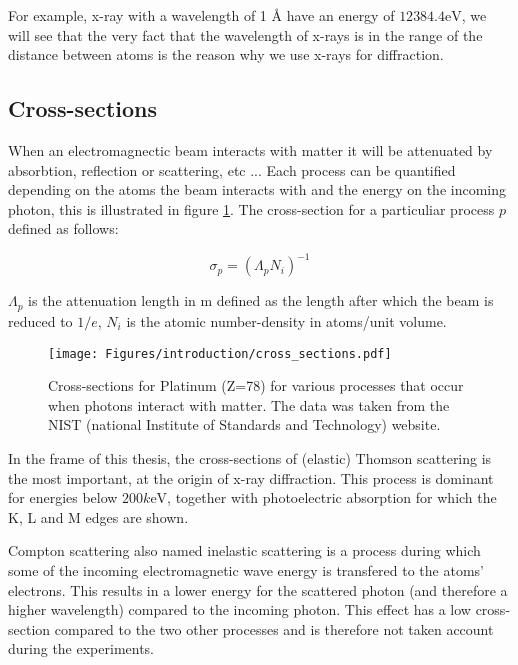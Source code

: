 For example, x-ray with a wavelength of 1 \si{\angstrom} have an energy of $12 384.4 \si{\electronvolt}$, we will see that the very fact that the wavelength of x-rays is in the range of the distance between atoms is the reason why we use x-rays for diffraction.

\subsection{Cross-sections}

When an electromagnectic beam interacts with matter it will be attenuated by absorbtion, reflection or scattering, etc ... Each process can be quantified depending on the atoms the beam interacts with and the energy on the incoming photon, this is illustrated in figure \ref{fig:cross_sections}. The cross-section for a particuliar process $p$ defined as follows:

\begin{equation}
	\sigma_p = (\Lambda_p N_i)^{-1}
\end{equation}

$\Lambda_p$ is the attenuation length in \si{\meter} defined as the length after which the beam is reduced to $1/e$, $N_i$ is the atomic number-density in atoms/unit volume.

\begin{figure}[h]
    \centering
    \texttt{[image: Figures/introduction/cross\_sections.pdf]}
    \caption{Cross-sections for Platinum (Z=78) for various processes that occur when photons interact with matter. The data was taken from the NIST (national Institute of Standards and Technology) \parencite{NIST_cross_sections} website.}
    \label{fig:cross_sections}
\end{figure}

In the frame of this thesis, the cross-sections of (elastic) Thomson scattering is the most important, at the origin of x-ray diffraction. This process is dominant for energies below $200 \si{k\electronvolt}$, together with photoelectric absorption for which the K, L and M edges are shown.

Compton scattering also named inelastic scattering is a process during which some of the incoming electromagnetic wave energy is transfered to the atoms' electrons. This results in a lower energy for the scattered photon (and therefore a higher wavelength) compared to the incoming photon. This effect has a low cross-section compared to the two other processes and is therefore not taken account during the experiments.

